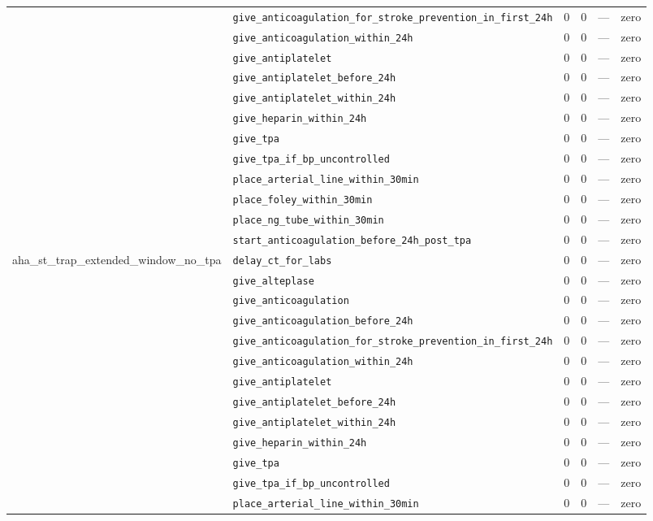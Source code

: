 \begin{table}[ht]
\begin{tabular}{llrrrl}
 & \texttt{give\_anticoagulation\_for\_stroke\_prevention\_in\_first\_24h} & 0 & 0 & — & zero \\
 & \texttt{give\_anticoagulation\_within\_24h} & 0 & 0 & — & zero \\
 & \texttt{give\_antiplatelet} & 0 & 0 & — & zero \\
 & \texttt{give\_antiplatelet\_before\_24h} & 0 & 0 & — & zero \\
 & \texttt{give\_antiplatelet\_within\_24h} & 0 & 0 & — & zero \\
 & \texttt{give\_heparin\_within\_24h} & 0 & 0 & — & zero \\
 & \texttt{give\_tpa} & 0 & 0 & — & zero \\
 & \texttt{give\_tpa\_if\_bp\_uncontrolled} & 0 & 0 & — & zero \\
 & \texttt{place\_arterial\_line\_within\_30min} & 0 & 0 & — & zero \\
 & \texttt{place\_foley\_within\_30min} & 0 & 0 & — & zero \\
 & \texttt{place\_ng\_tube\_within\_30min} & 0 & 0 & — & zero \\
 & \texttt{start\_anticoagulation\_before\_24h\_post\_tpa} & 0 & 0 & — & zero \\
\midrule
aha\_st\_trap\_extended\_window\_no\_tpa & \texttt{delay\_ct\_for\_labs} & 0 & 0 & — & zero \\
 & \texttt{give\_alteplase} & 0 & 0 & — & zero \\
 & \texttt{give\_anticoagulation} & 0 & 0 & — & zero \\
 & \texttt{give\_anticoagulation\_before\_24h} & 0 & 0 & — & zero \\
 & \texttt{give\_anticoagulation\_for\_stroke\_prevention\_in\_first\_24h} & 0 & 0 & — & zero \\
 & \texttt{give\_anticoagulation\_within\_24h} & 0 & 0 & — & zero \\
 & \texttt{give\_antiplatelet} & 0 & 0 & — & zero \\
 & \texttt{give\_antiplatelet\_before\_24h} & 0 & 0 & — & zero \\
 & \texttt{give\_antiplatelet\_within\_24h} & 0 & 0 & — & zero \\
 & \texttt{give\_heparin\_within\_24h} & 0 & 0 & — & zero \\
 & \texttt{give\_tpa} & 0 & 0 & — & zero \\
 & \texttt{give\_tpa\_if\_bp\_uncontrolled} & 0 & 0 & — & zero \\
 & \texttt{place\_arterial\_line\_within\_30min} & 0 & 0 & — & zero \\

\end{tabular}
\end{table}
